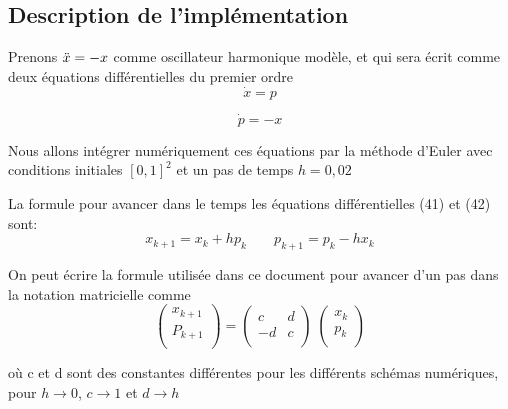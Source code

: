 

\subsection{Description de l'implémentation}

Prenons $\Ddot{x}=-x$ comme oscillateur harmonique modèle, et qui sera écrit comme deux équations différentielles du premier ordre
  \begin{equation}
    \Dot{x}=p
  \end{equation}

\begin{equation}
    \Dot{p}=-x
\end{equation}

Nous allons intégrer numériquement ces équations par la méthode d'Euler avec conditions initiales ${\left[ 0,1 \right]}^2$ et un pas de temps $h=0,02$ 



La formule pour avancer dans le temps les équations différentielles (41) et (42) sont:
\begin{equation}
   x_{k+1}= x_{k} + hp_{k}   \;\;\;\;\; \;\;   p_{k+1}= p_{k} - hx_{k} 
\end{equation}

On peut écrire la formule utilisée dans ce document pour avancer d'un pas dans la notation matricielle comme
 \begin{equation}
   \left(
  \begin{array}{rrrrrrr}
     x_{k+1}    \\ 
       P_{k+1} \\ 
    
    \end{array}
    \right) =\left(
    \begin{array}{rrrrrrr}
      c & d    \\ 
      -d & c   \\ 
    
      \end{array}
       \right) \;\left(
    \begin{array}{rrrrrrr}
      x_{k}   \\ 
      p_{k}   \\ 
    
      \end{array}
       \right)
\end{equation}

où c et d sont des constantes différentes pour les différents schémas numériques, pour $h \rightarrow{0}$,  $c \rightarrow{1}$ et $d \rightarrow{h}$



